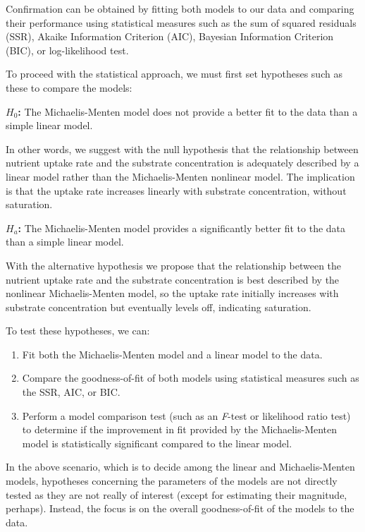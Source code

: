 \documentclass[
  letterpaper,
]{book}
\providecommand{\tightlist}{%
  \setlength{\itemsep}{0pt}\setlength{\parskip}{0pt}}\usepackage{longtable,booktabs,array}
\begin{document}
Confirmation can be obtained by fitting both models to our data and
comparing their performance using statistical measures such as the sum
of squared residuals (SSR), Akaike Information Criterion (AIC), Bayesian
Information Criterion (BIC), or log-likelihood test.

To proceed with the statistical approach, we must first set hypotheses
such as these to compare the models:

\textbf{\(H_0\):} The Michaelis-Menten model does not provide a better
fit to the data than a simple linear model.

In other words, we suggest with the null hypothesis that the
relationship between nutrient uptake rate and the substrate
concentration is adequately described by a linear model rather than the
Michaelis-Menten nonlinear model. The implication is that the uptake
rate increases linearly with substrate concentration, without
saturation.

\textbf{\(H_a\):} The Michaelis-Menten model provides a significantly
better fit to the data than a simple linear model.

With the alternative hypothesis we propose that the relationship between
the nutrient uptake rate and the substrate concentration is best
described by the nonlinear Michaelis-Menten model, so the uptake rate
initially increases with substrate concentration but eventually levels
off, indicating saturation.

To test these hypotheses, we can:

\begin{enumerate}
\def\labelenumi{\arabic{enumi}.}
\tightlist
\item
  Fit both the Michaelis-Menten model and a linear model to the data.
\item
  Compare the goodness-of-fit of both models using statistical measures
  such as the SSR, AIC, or BIC.
\item
  Perform a model comparison test (such as an \emph{F}-test or
  likelihood ratio test) to determine if the improvement in fit provided
  by the Michaelis-Menten model is statistically significant compared to
  the linear model.
\end{enumerate}

In the above scenario, which is to decide among the linear and
Michaelis-Menten models, hypotheses concerning the parameters of the
models are not directly tested as they are not really of interest
(except for estimating their magnitude, perhaps). Instead, the focus is
on the overall goodness-of-fit of the models to the data.
\end{document}
